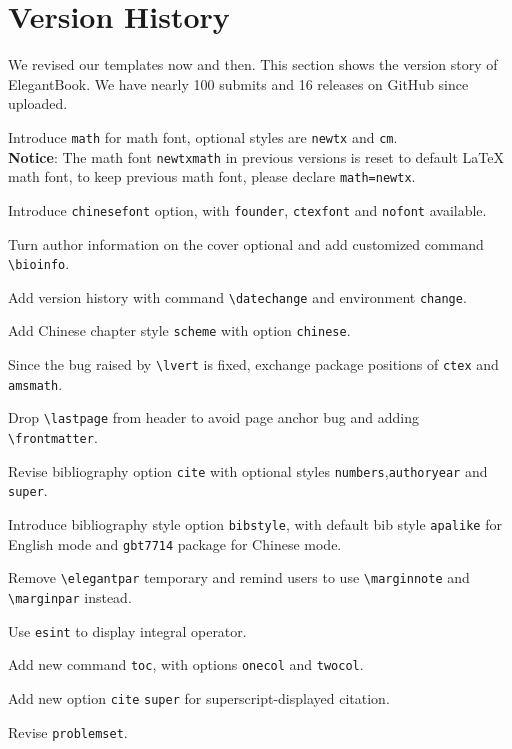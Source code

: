 \documentclass[11pt]{elegantbook}
\begin{document}
\chapter{Version History}
We revised our templates now and then. This section shows the version story of ElegantBook. We have nearly 100 submits and 16 releases on GitHub since uploaded.


\begin{change}
  \item Introduce \lstinline{math} for math font, optional styles are \lstinline{newtx} and \lstinline{cm}.\\
  \textbf{Notice}: The math font \lstinline{newtxmath} in previous versions is reset to default \LaTeX{} math font, to keep previous math font, please declare \lstinline{math=newtx}.
  \item Introduce \lstinline{chinesefont} option, with \lstinline{founder}, \lstinline{ctexfont} and \lstinline{nofont} available.
  \item Turn author information on the cover optional and add customized command \lstinline{\bioinfo}.
  \item Add version history with command \lstinline{\datechange} and environment \lstinline{change}.
  \item Add Chinese chapter style \lstinline{scheme} with option \lstinline{chinese}.
  \item Since the bug raised by \lstinline{\lvert} is fixed, exchange package positions of \lstinline{ctex} and \lstinline{amsmath}.
  \item Drop \lstinline{\lastpage} from header to avoid page anchor bug and adding \lstinline{\frontmatter}.
  \item Revise bibliography option \lstinline{cite} with optional styles \lstinline{numbers},\lstinline{authoryear} and \lstinline{super}.
  \item Introduce bibliography style option \lstinline{bibstyle}, with default bib style \lstinline{apalike} for English mode and \lstinline{gbt7714} package for Chinese mode.
\end{change}


\begin{change}
  \item Remove \lstinline{\elegantpar} temporary and remind users to use \lstinline{\marginnote} and \lstinline{\marginpar} instead.
  \item Use \lstinline{esint} to display integral operator.
  \item Add new command \lstinline{toc}, with options  \lstinline{onecol} and \lstinline{twocol}.
  \item Add new option \lstinline{cite} \lstinline{super} for superscript-displayed citation.
  \item Revise \lstinline{problemset}.
\end{change}
\end{document}
